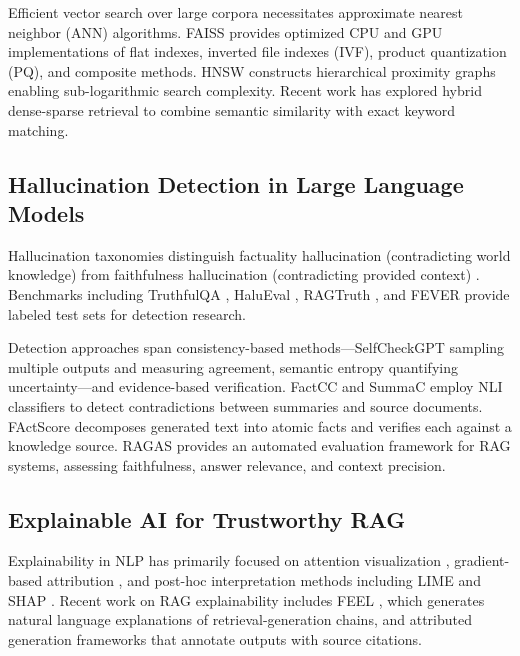 \documentclass[conference]{IEEEtran}
\begin{document}
Efficient vector search over large corpora necessitates approximate nearest neighbor (ANN) algorithms. FAISS \cite{johnson2019faiss} provides optimized CPU and GPU implementations of flat indexes, inverted file indexes (IVF), product quantization (PQ), and composite methods. HNSW \cite{malkov2018hnsw} constructs hierarchical proximity graphs enabling sub-logarithmic search complexity. Recent work has explored hybrid dense-sparse retrieval \cite{santhanam2022colbertv2,formal2021splade} to combine semantic similarity with exact keyword matching.

\subsection{Hallucination Detection in Large Language Models}

Hallucination taxonomies distinguish factuality hallucination (contradicting world knowledge) from faithfulness hallucination (contradicting provided context) \cite{ji2023survey,huang2025survey}. Benchmarks including TruthfulQA \cite{lin2022truthfulqa}, HaluEval \cite{li2023halueval}, RAGTruth \cite{niu2024ragtruth}, and FEVER \cite{thorne2018fever} provide labeled test sets for detection research.

Detection approaches span consistency-based methods—SelfCheckGPT \cite{manakul2023selfcheckgpt} sampling multiple outputs and measuring agreement, semantic entropy \cite{farquhar2024semantic} quantifying uncertainty—and evidence-based verification. FactCC \cite{kryscinski2020factcc} and SummaC \cite{laban2022summac} employ NLI classifiers to detect contradictions between summaries and source documents. FActScore \cite{min2023factscore} decomposes generated text into atomic facts and verifies each against a knowledge source. RAGAS \cite{es2024ragas} provides an automated evaluation framework for RAG systems, assessing faithfulness, answer relevance, and context precision.

\subsection{Explainable AI for Trustworthy RAG}

Explainability in NLP has primarily focused on attention visualization \cite{vaswani2017attention}, gradient-based attribution \cite{sundararajan2017axiomatic}, and post-hoc interpretation methods including LIME \cite{ribeiro2016lime} and SHAP \cite{lundberg2017shap}. Recent work on RAG explainability includes FEEL \cite{zhang2024feel}, which generates natural language explanations of retrieval-generation chains, and attributed generation frameworks \cite{agrawal2024attributed} that annotate outputs with source citations.
\end{document}
